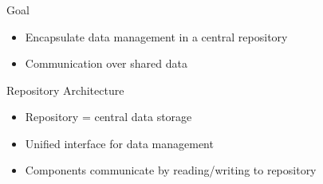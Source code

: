 \begin{frame}
    \frametitle{\insertsubsection{}}
    \begin{fancycolumns}[widths={45,55}]
        \begin{motivation}{Goal}
            \begin{itemize}
                \item Encapsulate data management in a central repository
                \item Communication over shared data
            \end{itemize}
        \end{motivation}
        \begin{definition}{Repository Architecture}
            \begin{itemize}
                \item Repository = central data storage
                \item Unified interface for data management
                \item Components communicate by reading/writing to repository
            \end{itemize}
        \end{definition}
        \nextcolumn
        \repositorydefault{}
    \end{fancycolumns}
\end{frame}

